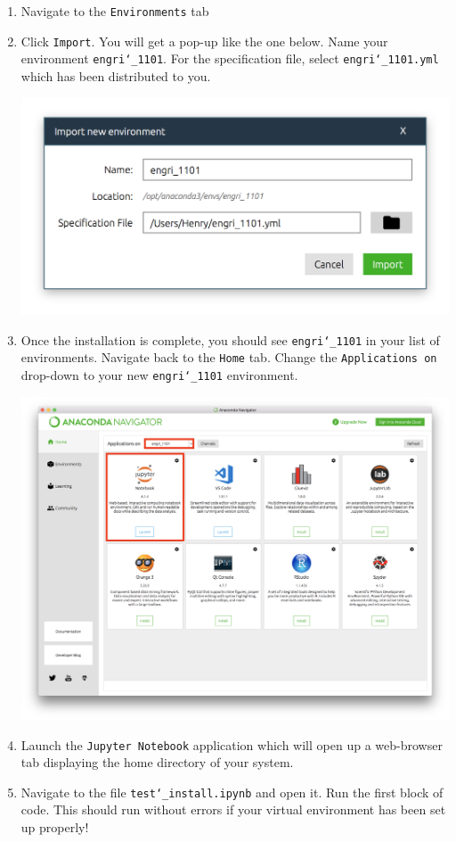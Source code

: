 \documentclass[11 pt]{article}
\begin{document}
\begin{enumerate}

\item Navigate to the \texttt{Environments} tab
\item Click \texttt{Import}. You will get a pop-up like the one below. Name your environment \texttt{engri\char`_1101}. For the specification file, select \texttt{engri\char`_1101.yml} which has been distributed to you. 

\begin{center}
\includegraphics[scale=0.4]{images/import_env}
\end{center}

\item Once the installation is complete, you should see \texttt{engri\char`_1101} in your list of environments. Navigate back to the \texttt{Home} tab. Change the \texttt{Applications on} drop-down to your new \texttt{engri\char`_1101} environment.

\begin{center}
\includegraphics[scale=0.3]{images/home_tab}
\end{center}

\item Launch the \texttt{Jupyter Notebook} application which will open up a web-browser tab displaying the home directory of your system. 

\item Navigate to the file \texttt{test\char`_install.ipynb} and open it. Run the first block of code. This should run without errors if your virtual environment has been set up properly!

\end{enumerate}
\end{document}

